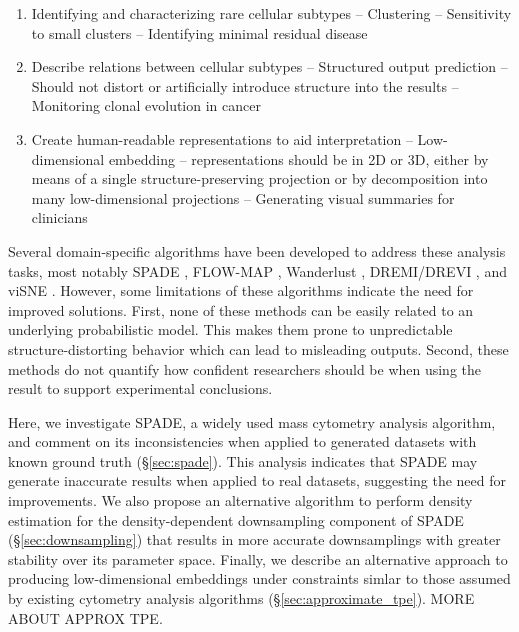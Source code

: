 \documentclass{article}
\begin{document}
\begin{enumerate}
\item Identifying and characterizing rare cellular subtypes -- Clustering --
Sensitivity to small clusters -- Identifying minimal residual disease 

\item Describe relations between cellular subtypes -- Structured output prediction -- Should not distort or artificially introduce structure into the results --  Monitoring clonal evolution in cancer 

\item Create human-readable representations to aid interpretation -- Low-dimensional embedding -- representations should be in 2D or 3D, either by means of a single structure-preserving projection or by decomposition into many low-dimensional projections -- Generating visual summaries for clinicians 
\end{enumerate}

Several domain-specific algorithms have been developed to address these analysis tasks, most notably SPADE \cite{}, FLOW-MAP \cite{}, Wanderlust \cite{}, DREMI/DREVI \cite{}, and viSNE \cite{}.  However, some limitations of these algorithms indicate the need for improved solutions.  First, none of these methods can be easily related to an underlying probabilistic model. This makes them prone to unpredictable structure-distorting behavior which can lead to misleading outputs. Second, these methods do not quantify how confident researchers should be when using the result to support experimental conclusions.

Here, we investigate SPADE, a widely used mass cytometry analysis algorithm,  and comment on its inconsistencies when applied to generated datasets with known ground truth (\S\ref{sec:spade}). This analysis indicates that SPADE may generate inaccurate results when applied to real datasets, suggesting the need for improvements.  We also propose an alternative algorithm to perform density estimation for the density-dependent downsampling component of SPADE  (\S\ref{sec:downsampling}) that results in more accurate downsamplings with greater stability over its parameter space. Finally, we describe an alternative approach to producing low-dimensional embeddings under constraints simlar to those assumed by existing cytometry analysis algorithms (\S\ref{sec:approximate_tpe}).   MORE ABOUT APPROX TPE. 
\end{document}
